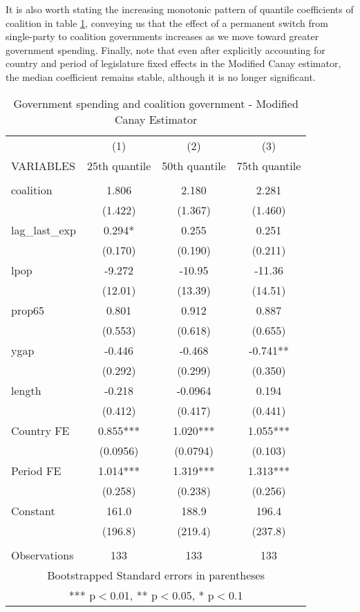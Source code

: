 \documentclass{article}
\begin{document}
It is also worth stating the increasing monotonic pattern of quantile coefficients of coalition in table \ref{tab:mcanay_results}, conveying us that the effect of a permanent switch from single-party to coalition governments increases as we move toward greater government spending. Finally, note that even after explicitly accounting for country and period of legislature fixed effects in the Modified Canay estimator, the median coefficient remains stable, although it is no longer significant.

\begin{table}
    \centering
    \caption{Government spending and coalition government - Modified Canay Estimator}
    \begin{tabular}{lccc}
    &   &   & \\ \hline
     & (1) & (2) & (3) \\
    VARIABLES & 25th quantile & 50th quantile & 75th quantile \\ \hline
     &  &  &  \\
    coalition & 1.806 & 2.180 & 2.281 \\
     & (1.422) & (1.367) & (1.460) \\
    lag\_last\_exp & 0.294* & 0.255 & 0.251 \\
     & (0.170) & (0.190) & (0.211) \\
    lpop & -9.272 & -10.95 & -11.36 \\
     & (12.01) & (13.39) & (14.51) \\
    prop65 & 0.801 & 0.912 & 0.887 \\
     & (0.553) & (0.618) & (0.655) \\
    ygap & -0.446 & -0.468 & -0.741** \\
     & (0.292) & (0.299) & (0.350) \\
    length & -0.218 & -0.0964 & 0.194 \\
     & (0.412) & (0.417) & (0.441) \\
    Country FE & 0.855*** & 1.020*** & 1.055*** \\
     & (0.0956) & (0.0794) & (0.103) \\
    Period FE & 1.014*** & 1.319*** & 1.313*** \\
     & (0.258) & (0.238) & (0.256) \\
    Constant & 161.0 & 188.9 & 196.4 \\
     & (196.8) & (219.4) & (237.8) \\
     &  &  &  \\
    Observations & 133 & 133 & 133 \\ \hline
    \multicolumn{4}{c}{ Bootstrapped Standard errors in parentheses} \\
    \multicolumn{4}{c}{ *** p$<$0.01, ** p$<$0.05, * p$<$0.1} \\
    \end{tabular}
    \label{tab:mcanay_results}
\end{table}
\end{document}
